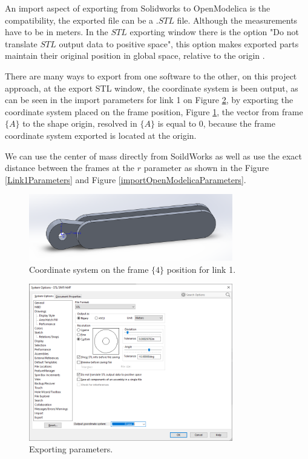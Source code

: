 \documentclass[transmag]{IEEEtran}
\begin{document}
An import aspect of exporting from Solidworks to OpenModelica is the compatibility, the exported file can be a $.STL$ file. Although the measurements have to be in meters.
In the $STL$ exporting window there is the option "Do not translate $STL$ output data to positive space", this option makes exported parts maintain their original position in global space, relative to the origin \cite{ref4}. 

There are many ways to export from one software to the other, on this project approach, at the export STL window, the coordinate system is been output, as can be seen in the import parameters for link 1 on Figure \ref{exportSolidworks}, by exporting the coordinate system placed on the frame position, Figure \ref{Link1Model}, the vector from frame $\{A\}$ to the shape origin, resolved in $\{A\}$ is equal to 0, because the frame coordinate system exported is located at the origin.

We can use the center of mass directly from SoildWorks as well as use the exact distance between the frames at the $r$ parameter as shown in the Figure \ref{Link1Parameters} and Figure \ref{importOpenModelicaParameters}.



\begin{figure}
\centerline{\includegraphics[width=3.5in]{./images/Link1Model}}
\caption{Coordinate system on the frame $\{4\}$ position for link 1.\label{Link1Model}}
\end{figure}

\begin{figure}
\centerline{\includegraphics[width=3.5in]{./images/exportSolidworks}}
\caption{Exporting parameters.\label{exportSolidworks}}
\end{figure}
\end{document}
